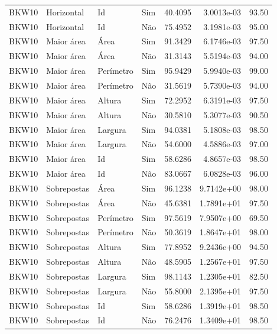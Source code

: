 \begin{tabular}{llllrrr}
    BKW10     & Horizontal  & Id        & Sim         & 40.4095      & 3.0013e-03 & 93.50    \\
    BKW10     & Horizontal  & Id        & Não         & 75.4952      & 3.1981e-03 & 95.00    \\
    BKW10     & Maior área  & Área      & Sim         & 91.3429      & 6.1746e-03 & 97.50    \\
    BKW10     & Maior área  & Área      & Não         & 31.3143      & 5.5194e-03 & 94.00    \\
    BKW10     & Maior área  & Perímetro & Sim         & 95.9429      & 5.9940e-03 & 99.00    \\
    BKW10     & Maior área  & Perímetro & Não         & 31.5619      & 5.7390e-03 & 94.00    \\
    BKW10     & Maior área  & Altura    & Sim         & 72.2952      & 6.3191e-03 & 97.50    \\
    BKW10     & Maior área  & Altura    & Não         & 30.5810      & 5.3077e-03 & 90.50    \\
    BKW10     & Maior área  & Largura   & Sim         & 94.0381      & 5.1808e-03 & 98.50    \\
    BKW10     & Maior área  & Largura   & Não         & 54.6000      & 4.5886e-03 & 97.00    \\
    BKW10     & Maior área  & Id        & Sim         & 58.6286      & 4.8657e-03 & 98.50    \\
    BKW10     & Maior área  & Id        & Não         & 83.0667      & 6.0828e-03 & 96.00    \\
    BKW10     & Sobrepostas & Área      & Sim         & 96.1238      & 9.7142e+00 & 98.00    \\
    BKW10     & Sobrepostas & Área      & Não         & 45.6381      & 1.7891e+01 & 97.50    \\
    BKW10     & Sobrepostas & Perímetro & Sim         & 97.5619      & 7.9507e+00 & 69.50    \\
    BKW10     & Sobrepostas & Perímetro & Não         & 50.3619      & 1.8647e+01 & 98.00    \\
    BKW10     & Sobrepostas & Altura    & Sim         & 77.8952      & 9.2436e+00 & 94.50    \\
    BKW10     & Sobrepostas & Altura    & Não         & 48.5905      & 1.2567e+01 & 97.50    \\
    BKW10     & Sobrepostas & Largura   & Sim         & 98.1143      & 1.2305e+01 & 82.50    \\
    BKW10     & Sobrepostas & Largura   & Não         & 55.8000      & 2.1395e+01 & 97.50    \\
    BKW10     & Sobrepostas & Id        & Sim         & 58.6286      & 1.3919e+01 & 98.50    \\
    BKW10     & Sobrepostas & Id        & Não         & 76.2476      & 1.3409e+01 & 98.50    \\
    \hline
\end{tabular}